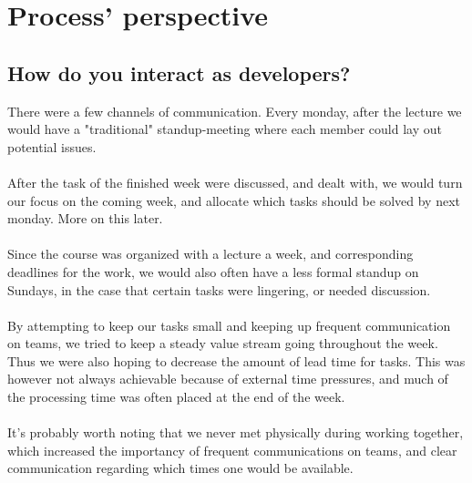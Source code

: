 \section{Process' perspective}
\subsection{How do you interact as developers?}
There were a few channels of communication. Every monday, after the lecture we would have a "traditional" standup-meeting where each member could lay out potential issues.
\\\\
After the task of the finished week were discussed, and dealt with, we would turn our focus on the coming week, and allocate which tasks should be solved by next monday. More on this later.
\\\\
Since the course was organized with a lecture a week, and corresponding deadlines for the work, we would also often have a less formal standup on Sundays, in the case that certain tasks were lingering, or needed discussion.
\\\\
By attempting to keep our tasks small and keeping up frequent communication on teams, we tried to keep a steady value stream going throughout the week. Thus we were also hoping to decrease the amount of lead time for tasks. This was however not always achievable because of external time pressures, and much of the processing time was often placed at the end of the week.
\\\\
It's probably worth noting that we never met physically during working together, which increased the importancy of frequent communications on teams, and clear communication regarding which times one would be available.
